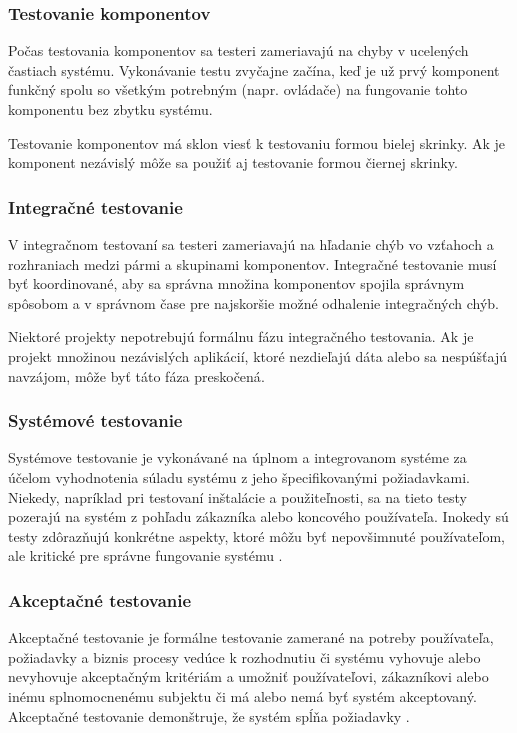 \documentclass[11pt,twoside,slovak,a4paper]{article}
\begin{document}
		\subsubsection{Testovanie komponentov} 
		
			Počas testovania komponentov sa testeri zameriavajú na chyby v ucelených častiach systému. Vykonávanie testu zvyčajne začína, keď je už prvý komponent funkčný spolu so všetkým potrebným (napr. ovládače) na fungovanie tohto komponentu bez zbytku systému\cite{Alba2008}.
			
			Testovanie komponentov má sklon viesť k testovaniu formou bielej skrinky. Ak je komponent nezávislý môže sa použiť aj testovanie formou čiernej skrinky\cite{Alba2008}.
		\subsubsection{Integračné testovanie} 
		
			V integračnom testovaní sa testeri zameriavajú na hľadanie chýb vo vzťahoch a rozhraniach medzi pármi a skupinami komponentov. Integračné testovanie musí byť koordinované, aby sa správna množina komponentov spojila správnym spôsobom a v správnom čase	pre najskoršie možné odhalenie integračných chýb\cite{Alba2008}.
			
			Niektoré projekty nepotrebujú formálnu fázu integračného testovania. Ak je projekt množinou nezávislých aplikácií, ktoré nezdieľajú dáta alebo sa nespúšťajú navzájom, môže byť táto fáza preskočená\cite{Alba2008}.
		\subsubsection{Systémové testovanie} 
				
			Systémove testovanie je vykonávané na úplnom a integrovanom systéme za účelom vyhodnotenia súladu systému z jeho špecifikovanými požiadavkami\cite{Dictionary}. 
			Niekedy, napríklad pri testovaní inštalácie a použiteľnosti, sa na tieto testy pozerajú na systém z pohľadu zákazníka alebo koncového používateľa. Inokedy sú testy zdôrazňujú konkrétne aspekty, ktoré môžu byť nepovšimnuté používateľom, ale kritické pre správne fungovanie systému \cite{Alba2008}.
			
	\subsubsection{Akceptačné testovanie}	
	
			Akceptačné testovanie je formálne testovanie zamerané na potreby používateľa, požiadavky a  biznis procesy vedúce k rozhodnutiu či systému vyhovuje alebo nevyhovuje akceptačným kritériám a umožniť používateľovi, zákazníkovi alebo inému splnomocnenému subjektu či má alebo nemá byť systém akceptovaný\cite{Veenendaal2010}. Akceptačné testovanie demonštruje, že systém spĺňa požiadavky \cite{Alba2008}. 
			
\end{document}
